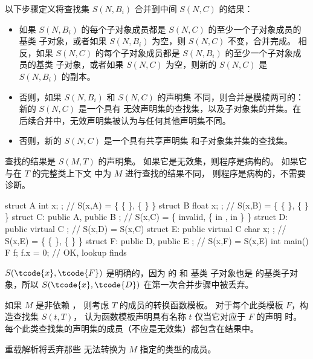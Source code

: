 \pnum
以下步骤定义将查找集 $S(N,B_i)$
合并到中间 $S(N,C)$ 的结果：

\begin{itemize}
\item 如果 $S(N,B_i)$ 的每个子对象成员都是 $S(N,C)$ 的至少一个子对象成员的基类
子对象，或者如果 $S(N,B_i)$ 为空，则 $S(N,C)$ 不变，合并完成。
相反，如果 $S(N,C)$ 的每个子对象成员都是 $S(N,B_i)$ 的至少一个子对象成员的基类
子对象，或者如果 $S(N,C)$ 为空，则新的 $S(N,C)$ 是 $S(N,B_i)$ 的副本。

\item 否则，如果 $S(N,B_i)$ 和 $S(N,C)$ 的声明集
不同，则合并是模棱两可的：新的 $S(N,C)$ 是一个具有
无效声明集的查找集，以及子对象集的并集。在
后续合并中，无效声明集被认为与任何其他声明集不同。

\item 否则，新的 $S(N,C)$ 是一个具有共享声明集
和子对象集并集的查找集。
\end{itemize}

\pnum
查找的结果是 $S(M,T)$ 的声明集。
如果它是无效集，则程序是病构的。
如果它与在 $T$ 的完整类上下文 中为 $M$ 进行查找的结果不同，
则程序是病构的，不需要诊断。
\begin{example}
\begin{codeblock}
struct A { int x; };                    // S(x,A) = \{ \{  \}, \{  \} \}
struct B { float x; };                  // S(x,B) = \{ \{  \}, \{  \} \}
struct C: public A, public B { };       // S(x,C) = \{ invalid, \{  in ,  in  \} \}
struct D: public virtual C { };         // S(x,D) = S(x,C)
struct E: public virtual C { char x; }; // S(x,E) = \{ \{  \}, \{  \} \}
struct F: public D, public E { };       // S(x,F) = S(x,E)
int main() {
  F f;
  f.x = 0;                              // OK, lookup finds 
}
\end{codeblock}

$S(\tcode{x},\tcode{F})$ 是明确的，因为  的  和  基类
子对象也是  的基类子对象，所以
$S(\tcode{x},\tcode{D})$ 在第一次合并步骤中被丢弃。
\end{example}

\pnum
如果 $M$ 是非依赖 ，
则考虑 $T$ 的成员的转换函数模板。
对于每个此类模板 $F$，构造查找集 $S(t,T)$，
认为函数模板声明具有名称 $t$
仅当它对应于 $F$ 的声明 时。
每个此类查找集的声明集的成员（不应是无效集）都包含在结果中。
\begin{note}
重载解析将丢弃那些
无法转换为 $M$ 指定的类型的成员。
\end{note}

